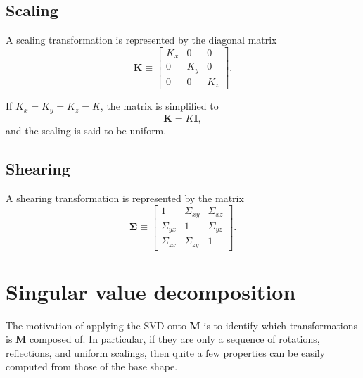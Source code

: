 \subsection{Scaling}
A scaling transformation is represented by the diagonal matrix
\begin{equation}
    \bm{K} \equiv
    \begin{bmatrix}
        K_x & 0 & 0 \\
        0 & K_y & 0 \\
        0 & 0 & K_z
    \end{bmatrix}.
\end{equation}

If $K_x = K_y = K_z = K$, the matrix is simplified to
\begin{equation}
    \bm{K} = K\bm{I},    
\end{equation}
and the scaling is said to be uniform.

\subsection{Shearing}
A shearing transformation is represented by the matrix
\begin{equation}
    \bm{\Sigma} \equiv
    \begin{bmatrix}
        1 & \Sigma_{xy} & \Sigma_{xz} \\
        \Sigma_{yx} & 1 & \Sigma_{yz} \\
        \Sigma_{zx} & \Sigma_{zy} & 1
    \end{bmatrix}.
\end{equation}

\section{Singular value decomposition}
The motivation of applying the SVD onto $\bm{M}$ is to identify which transformations is $\bm{M}$ composed of. In particular, if they are only a sequence of rotations, reflections, and uniform scalings, then quite
a few properties can be easily computed from those of the base shape. 